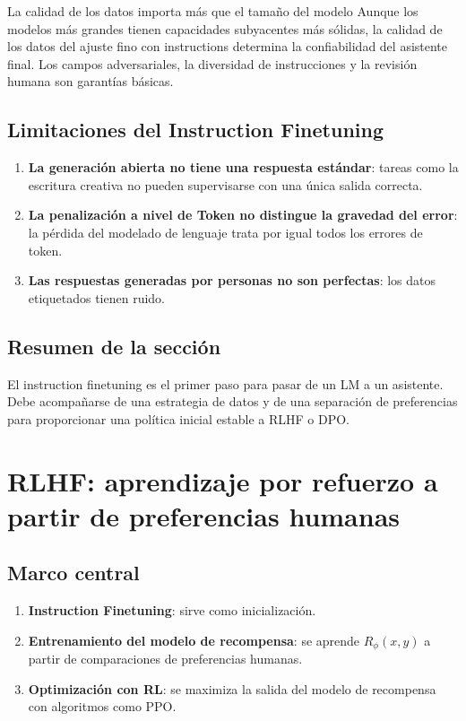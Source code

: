 \documentclass[a4paper]{article}
\begin{document}
\begin{importantbox}{La calidad de los datos importa más que el tamaño del modelo}
Aunque los modelos más grandes tienen capacidades subyacentes más sólidas, la calidad de los datos del ajuste fino con instructions determina la confiabilidad del asistente final. Los campos adversariales, la diversidad de instrucciones y la revisión humana son garantías básicas.
\end{importantbox}

\subsection{Limitaciones del Instruction Finetuning}

\begin{enumerate}
    \item \textbf{La generación abierta no tiene una respuesta estándar}: tareas como la escritura creativa no pueden supervisarse con una única salida correcta.
    \item \textbf{La penalización a nivel de Token no distingue la gravedad del error}: la pérdida del modelado de lenguaje trata por igual todos los errores de token.
    \item \textbf{Las respuestas generadas por personas no son perfectas}: los datos etiquetados tienen ruido.
\end{enumerate}

\subsection{Resumen de la sección}

El instruction finetuning es el primer paso para pasar de un LM a un asistente. Debe acompañarse de una estrategia de datos y de una separación de preferencias para proporcionar una política inicial estable a RLHF o DPO.

\section{RLHF: aprendizaje por refuerzo a partir de preferencias humanas}

\subsection{Marco central}

\begin{enumerate}
    \item \textbf{Instruction Finetuning}: sirve como inicialización.
    \item \textbf{Entrenamiento del modelo de recompensa}: se aprende $R_\phi(x, y)$ a partir de comparaciones de preferencias humanas.
    \item \textbf{Optimización con RL}: se maximiza la salida del modelo de recompensa con algoritmos como PPO.
\end{enumerate}
\end{document}
